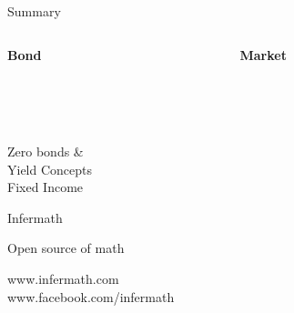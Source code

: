 \documentclass[20pt,xcolor={dvipsnames}]{beamer}
\begin{document}
\begin{frame}[c]
\centering
Summary

\begin{columns}
\begin{column}{0.5\textwidth}
\begin{framed}
\centering
\textbf{Bond} \\
\vspace{0.5cm}
\\
 \\
 \\
\end{framed}
\end{column}


\begin{column}{0.5\textwidth}
\color{MyRed}
\begin{framed}
\centering
\textbf{Market} \\
\vspace{0.5cm}
\\
 \\
 \\
\end{framed}
\end{column}
\end{columns}

\end{frame}


\begin{frame}

\huge

Zero bonds \& \\
Yield Concepts\\
Fixed Income

\end{frame}


\begin{frame}[c]

\centering


\vspace{-1cm}

\Huge Infermath 

\normalsize Open source of math 

\vspace{1cm}

\large www.infermath.com \\
www.facebook.com/infermath 

\end{frame}
\end{document}
